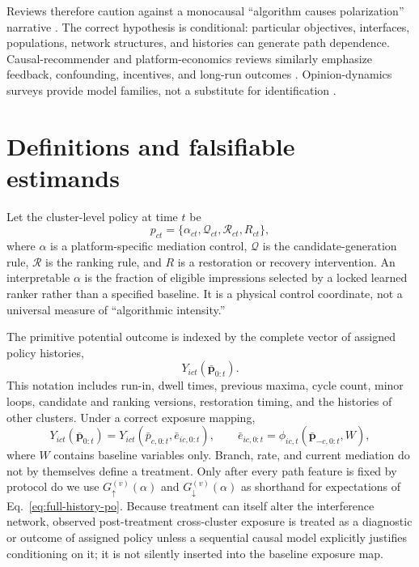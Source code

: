 \documentclass[pdflatex,sn-mathphys-num]{sn-jnl}
\begin{document}
Reviews therefore caution against a monocausal ``algorithm causes polarization'' narrative \cite{kubin2021review,vanbavel2021shapes,hartmann2025review,mahmoudi2024review}. The correct hypothesis is conditional: particular objectives, interfaces, populations, network structures, and histories can generate path dependence. Causal-recommender and platform-economics reviews similarly emphasize feedback, confounding, incentives, and long-run outcomes \cite{gao2024causal,ge2024trustworthy,aridor2024economics}. Opinion-dynamics surveys provide model families, not a substitute for identification \cite{noorazar2020survey}.

\section{Definitions and falsifiable estimands}

Let the cluster-level policy at time $t$ be
\begin{equation}
p_{ct}=\{\alpha_{ct},\mathcal Q_{ct},\mathcal R_{ct},R_{ct}\},
\end{equation}
where $\alpha$ is a platform-specific mediation control, $\mathcal Q$ is the candidate-generation rule, $\mathcal R$ is the ranking rule, and $R$ is a restoration or recovery intervention. An interpretable $\alpha$ is the fraction of eligible impressions selected by a locked learned ranker rather than a specified baseline. It is a physical control coordinate, not a universal measure of ``algorithmic intensity.''

The primitive potential outcome is indexed by the complete vector of assigned policy histories,
\begin{equation}
Y_{ict}\!\left(\bm{\bar p}_{0:t}\right).
\label{eq:full-history-po}
\end{equation}
This notation includes run-in, dwell times, previous maxima, cycle count, minor loops, candidate and ranking versions, restoration timing, and the histories of other clusters. Under a correct exposure mapping,
\begin{equation}
Y_{ict}\!\left(\bm{\bar p}_{0:t}\right)
=Y_{ict}\!\left(\bar p_{c,0:t},\bar e_{ic,0:t}\right),
\qquad
\bar e_{ic,0:t}=\phi_{ic,t}\!\left(\bm{\bar p}_{-c,0:t},W\right),
\label{eq:exposure-map}
\end{equation}
where $W$ contains baseline variables only. Branch, rate, and current mediation do not by themselves define a treatment. Only after every path feature is fixed by protocol do we use $G_{\uparrow}^{(v)}(\alpha)$ and $G_{\downarrow}^{(v)}(\alpha)$ as shorthand for expectations of Eq.~\eqref{eq:full-history-po}. Because treatment can itself alter the interference network, observed post-treatment cross-cluster exposure is treated as a diagnostic or outcome of assigned policy unless a sequential causal model explicitly justifies conditioning on it; it is not silently inserted into the baseline exposure map.
\end{document}

